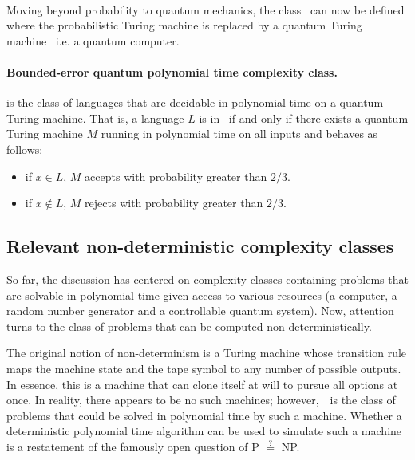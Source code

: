 \documentclass[11pt,oneside,final]{huthesis}%
\begin{document}
\paragraph*{}

Moving beyond probability to quantum mechanics, the class \bqp~can now be defined where the probabilistic Turing machine is replaced by a quantum Turing machine~\cite{Deutsch85,Bernstein97} i.e. a quantum computer.

\paragraph{Bounded-error quantum polynomial time complexity class.} {\bqp} is the class of languages that are decidable in polynomial time on a quantum Turing machine.  That is, a language $L$ is in \bqp~if and only if there exists a quantum Turing machine $M$ running in polynomial time on all inputs and behaves as follows:
	\begin{itemize}
		\item if ${x}\in L$,  $M$ accepts with probability greater than $2/3$.
		\item if ${x}\notin L$, $M$ rejects with probability greater than $2/3$.
	\end{itemize}

\subsection{Relevant non-deterministic complexity classes}
So far, the discussion has centered on complexity classes containing problems that are solvable in polynomial time given access to various resources (a computer, a random number generator and a controllable quantum system).  Now, attention turns to the class of problems that can be computed non-deterministically.

The original notion of non-determinism is a Turing machine whose transition rule maps the machine state and the tape symbol to any number of possible outputs.  In essence, this is a machine that can clone itself at will to pursue all options at once.  In reality, there appears to be no such machines; however,~\np~is the class of problems that could be solved in polynomial time by such a machine.  
Whether a deterministic polynomial time algorithm can be used to simulate such a machine is a restatement of the famously open question of {P} $\stackrel{?}{=}$ {NP}.
\end{document}
